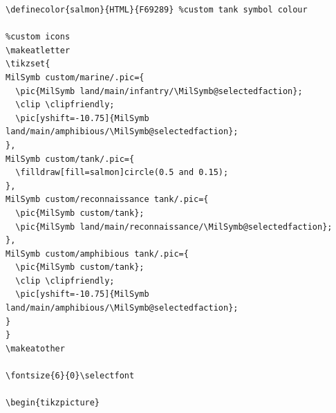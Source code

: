 \documentclass[a4paper, titlepage]{article}
\newenvironment{writett}{\ttfamily}{\par}
\begin{document}
\begin{landscape}

\begin{writett}
\fontsize{6}{0}\selectfont
\begin{verbatim}
\definecolor{salmon}{HTML}{F69289} %custom tank symbol colour

%custom icons
\makeatletter
\tikzset{
MilSymb custom/marine/.pic={
  \pic{MilSymb land/main/infantry/\MilSymb@selectedfaction};
  \clip \clipfriendly;
  \pic[yshift=-10.75]{MilSymb land/main/amphibious/\MilSymb@selectedfaction};
},
MilSymb custom/tank/.pic={
  \filldraw[fill=salmon]circle(0.5 and 0.15);
},
MilSymb custom/reconnaissance tank/.pic={
  \pic{MilSymb custom/tank};
  \pic{MilSymb land/main/reconnaissance/\MilSymb@selectedfaction};
},
MilSymb custom/amphibious tank/.pic={
  \pic{MilSymb custom/tank};
  \clip \clipfriendly;
  \pic[yshift=-10.75]{MilSymb land/main/amphibious/\MilSymb@selectedfaction};
}
}
\makeatother

\fontsize{6}{0}\selectfont

\begin{tikzpicture}


\end{verbatim}
\end{writett}
\end{landscape}
\end{document}
